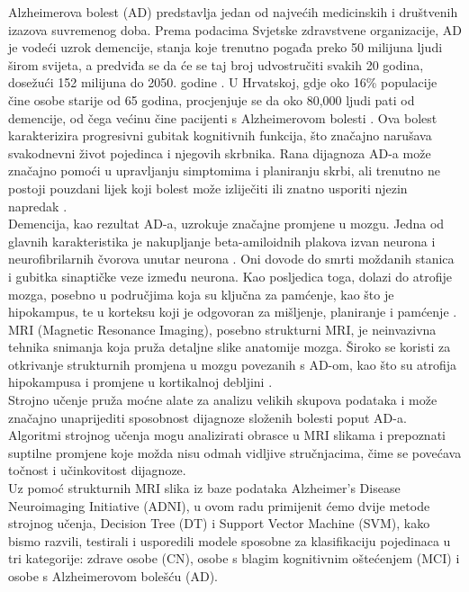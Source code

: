 \documentclass[zavrsnirad]{fer}
\begin{document}
Alzheimerova bolest (AD) predstavlja jedan od najvećih medicinskih i društvenih izazova suvremenog doba. Prema podacima Svjetske zdravstvene organizacije, AD je vodeći uzrok demencije, stanja koje trenutno pogađa preko 50 milijuna ljudi širom svijeta, a predviđa se da će se taj broj udvostručiti svakih 20 godina, dosežući 152 milijuna do 2050. godine \cite{PMID:29763097}. U Hrvatskoj, gdje oko 16\% populacije čine osobe starije od 65 godina, procjenjuje se da oko 80,000 ljudi pati od demencije, od čega većinu čine pacijenti s Alzheimerovom bolesti \cite{MIMICA2010409}. Ova bolest karakterizira progresivni gubitak kognitivnih funkcija, što značajno narušava svakodnevni život pojedinca i njegovih skrbnika. Rana dijagnoza AD-a može značajno pomoći u upravljanju simptomima i planiranju skrbi, ali trenutno ne postoji pouzdani lijek koji bolest može izliječiti ili znatno usporiti njezin napredak \cite{PMID:29763097}.
\\
Demencija, kao rezultat AD-a, uzrokuje značajne promjene u mozgu. Jedna od glavnih karakteristika je nakupljanje beta-amiloidnih plakova izvan neurona i neurofibrilarnih čvorova unutar neurona \cite{10.1007/s00500-020-05292-x}. Oni dovode do smrti moždanih stanica i gubitka sinaptičke veze između neurona. Kao posljedica toga, dolazi do atrofije mozga, posebno u područjima koja su ključna za pamćenje, kao što je hipokampus, te u korteksu koji je odgovoran za mišljenje, planiranje i pamćenje \cite{doi:10.1212/WNL.0b013e3181c3f293}.
\\
MRI (Magnetic Resonance Imaging), posebno strukturni MRI, je neinvazivna tehnika snimanja koja pruža detaljne slike anatomije mozga. Široko se koristi za otkrivanje strukturnih promjena u mozgu povezanih s AD-om, kao što su atrofija hipokampusa i promjene u kortikalnoj debljini \cite{10.3389/fnins.2015.00307}. 
\\
Strojno učenje pruža moćne alate za analizu velikih skupova podataka i može značajno unaprijediti sposobnost dijagnoze složenih bolesti poput AD-a. Algoritmi strojnog učenja mogu analizirati obrasce u MRI slikama i prepoznati suptilne promjene koje možda nisu odmah vidljive stručnjacima, čime se povećava točnost i učinkovitost dijagnoze.
\\
Uz pomoć strukturnih MRI slika iz baze podataka Alzheimer’s Disease Neuroimaging Initiative (ADNI), u ovom radu primijenit ćemo dvije metode strojnog učenja, Decision Tree (DT) i Support Vector Machine (SVM), kako bismo razvili, testirali i usporedili modele sposobne za klasifikaciju pojedinaca u tri kategorije: zdrave osobe (CN), osobe s blagim kognitivnim oštećenjem (MCI) i osobe s Alzheimerovom bolešću (AD).
\end{document}
